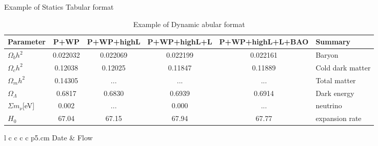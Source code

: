 \documentclass{article}
\begin{document}
\begin{table}
  \centering
  \caption{Example of Statics Tabular format}

  \begin{tabular}{l  c  c   c  c  p{}}
  \hline\hline
   Parameter & P+WP & P+WP+highL & P+WP+highL+L & P+WP+highL+L+BAO & Summary \\ \hline
    $\Omega_bh^2$ & 0.022032 & 0.022069 & 0.022199 & 0.022161 & Baryon    \\ 
    $\Omega_ch^2$& 0.12038 & 0.12025 & 0.11847 & 0.11889 & Cold dark matter \\
    $\Omega_mh^2$& 0.14305 & ... & ... & ... & Total matter \\ 
    $\Omega_{\Lambda}$ & 0.6817 & 0.6830 & 0.6939 & 0.6914 & Dark energy \\
    $\Sigma m_{\nu}$[eV]&0.002&...&0.000&...&neutrino\\
    $H_0$& 67.04&67.15&67.94&67.77&expansion rate \\\hline
    
  \end{tabular}
  
  \caption{Example of Dynamic abular format}
  \begin{tabular}{l  c  c   c  c  p{}}
  \hline
    Date &  {Flow} \tabularnewline \hline    
   
  \end{tabular}
\end{table}
\end{document}
